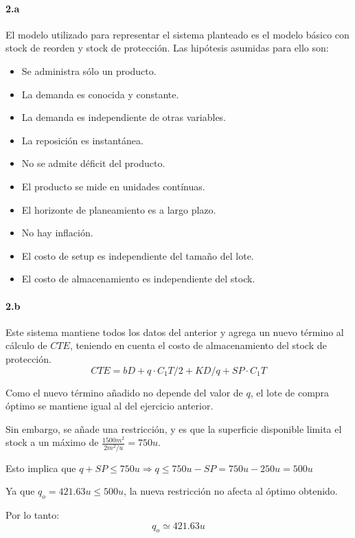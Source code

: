 \documentclass{article}
\begin{document}
  \paragraph{2.a}
    El modelo utilizado para representar el sistema planteado es el modelo básico con stock de reorden y stock de protección. Las hipótesis asumidas para ello son:
    \begin{itemize}
      \item Se administra sólo un producto.
      \item La demanda es conocida y constante.
      \item La demanda es independiente de otras variables.
      \item La reposición es instantánea.
      \item No se admite déficit del producto.
      \item El producto se mide en unidades contínuas.
      \item El horizonte de planeamiento es a largo plazo.
      \item No hay inflación.
      \item El costo de setup es independiente del tamaño del lote.
      \item El costo de almacenamiento es independiente del stock.
    \end{itemize}

  \paragraph{2.b}
    Este sistema mantiene todos los datos del anterior y agrega un nuevo término al cálculo de $CTE$, teniendo en cuenta el costo de almacenamiento del stock de protección.
        $$ CTE = b D + q \cdot C_1 T / 2 + K D / q + SP \cdot C_1 T $$

    Como el nuevo término añadido no depende del valor de $q$, el lote de compra óptimo se mantiene igual al del ejercicio anterior.

    Sin embargo, se añade una restricción, y es que la superficie disponible limita el stock a un máximo de $\frac{1500m^2}{2m^2/u} = 750u $.

    Esto implica que $ q + SP \le 750u \Rightarrow q \le 750u - SP = 750u - 250u = 500u$

    Ya que $q_o = 421.63u \le 500u $, la nueva restricción no afecta al óptimo obtenido.
    
    Por lo tanto:
        $$ \boxed{ q_o \simeq 421.63u} $$
\end{document}
